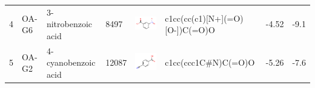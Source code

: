 \documentclass[aps,pre,twocolumn,nofootinbib,superscriptaddress,10pt, final,tightenlines]{revtex4-1}
\begin{document}
\begin{table}
\begin{tabular}{llllp{1.5cm}>{\ttfamily}lS[table-format=-1.3, table-figures-uncertainty=1]S[table-format=-1.2, table-figures-uncertainty=1]}
4 & OA-G6    & 3-nitrobenzoic acid                 & 8497             & \parbox[c]{1em}{\includegraphics[scale=0.15]{figures/8497.pdf}}     & c1cc(cc(c1)[N+](=O)[O-])C(=O)O  & -4.52      & -9.1        \\
5 & OA-G2    & 4-cyanobenzoic acid                 & 12087            & \parbox[c]{1em}{\includegraphics[scale=0.15]{figures/12087.pdf}}    & c1cc(ccc1C\#N)C(=O)O            & -5.26      & -7.6        \\

\end{tabular}
\end{table}
\end{document}
